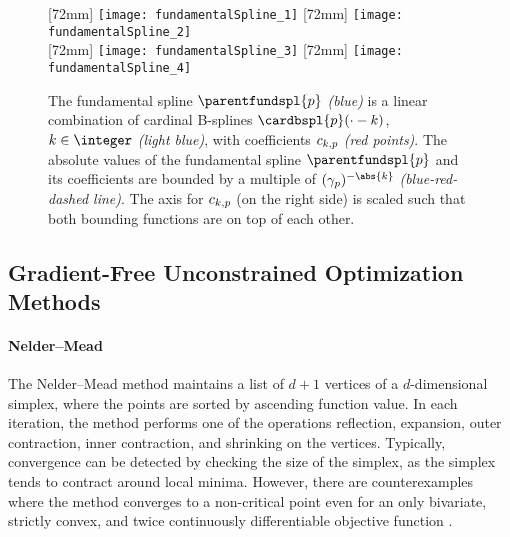 \begin{figure}
  [72mm]{%
    \texttt{[image: fundamentalSpline\_1]}%
  }%
  \hfill%
  [72mm]{%
    \texttt{[image: fundamentalSpline\_2]}%
  }\\[4mm]%
  [72mm]{%
    \texttt{[image: fundamentalSpline\_3]}%
  }%
  \hfill%
  [72mm]{%
    \texttt{[image: fundamentalSpline\_4]}%
  }%
  \caption[%
  Fundamental splines and their B-spline coefficients%
  ]{%
    The fundamental spline $\parentfundspl{p}$ \emph{\textcolor{C0}{(blue)}}
    is a linear combination of cardinal B-splines $\cardbspl{p}({\cdot} - k)$,
    $k \in \integer$ \emph{\textcolor{C0!50}{(light blue)}},
    with coefficients $\fundsplcoeff{k}{p}$ \emph{\textcolor{C1}{(red points)}}.
    The absolute values of the fundamental spline $\parentfundspl{p}$ and
    its coefficients are bounded by a multiple of $(\gamma_p)^{-\abs{k}}$
    \emph{(\textcolor{C0}{blue}-\textcolor{C1}{red}-dashed line)}.
    The axis for $\fundsplcoeff{k}{p}$ (on the right side) is scaled such that
    both bounding functions are on top of each other.%
  }%
  \label{fig:fundamentalSpline}%
\end{figure}


\subsection{Gradient-Free Unconstrained Optimization Methods}
\label{sec:511gradientFree}

\paragraph{Nelder--Mead}

The Nelder--Mead method
maintains a list of $d + 1$ vertices of a $d$-dimensional simplex,
where the points are sorted by ascending function value.
In each iteration,
the method performs one of the operations
reflection, expansion, outer contraction, inner contraction, and shrinking
on the vertices.
Typically, convergence can be detected by
checking the size of the simplex,
as the simplex tends to contract around local minima.
However, there are counterexamples where the method converges to
a non-critical point even for an only bivariate, strictly convex, and
twice continuously differentiable objective function
\cite{McKinnon98Convergence}.

